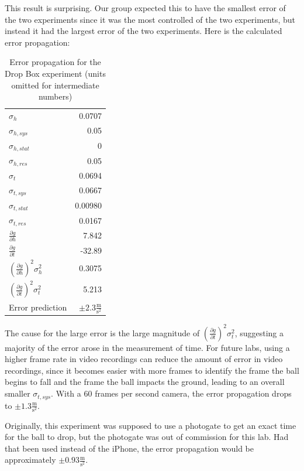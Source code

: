 \documentclass[12pt]{article}
\begin{document}
This result is surprising. Our group expected this to have the smallest error of the two experiments since it was the most controlled of the two experiments, but instead it had the largest error of the two experiments. Here is the calculated error propagation:

\begin{table}[htbp]
\caption{\label{table:dropbox-error}Error propagation for the Drop Box experiment (units omitted for intermediate numbers)}
\centering
\begin{tabular}{l|r}
\hline
\(\sigma_h\) & 0.0707\\
\(\sigma_{h,sys}\) & 0.05\\
\(\sigma_{h,stat}\) & 0\\
\(\sigma_{h,res}\) & 0.05\\
\hline
\(\sigma_t\) & 0.0694\\
\(\sigma_{t,sys}\) & 0.0667\\
\(\sigma_{t,stat}\) & 0.00980\\
\(\sigma_{t,res}\) & 0.0167\\
\hline
\(\frac{\partial g}{\partial h}\) & 7.842\\
\(\frac{\partial g}{\partial t}\) & -32.89\\
\hline
\(\left(\frac{\partial g}{\partial h}\right)^{2}\sigma_{h}^2\) & 0.3075\\
\(\left(\frac{\partial g}{\partial t}\right)^{2}\sigma_{t}^2\) & 5.213\\
\hline
Error prediction & \(\pm 2.3 \frac{\text{m}}{\text{s}^{2}}\)\\
\end{tabular}
\end{table}

The cause for the large error is the large magnitude of \(\left(\frac{\partial g}{\partial t}\right)^{2}\sigma_{t}^2\), suggesting a majority of the error arose in the measurement of time. For future labs, using a higher frame rate in video recordings can reduce the amount of error in video recordings, since it becomes easier with more frames to identify the frame the ball begins to fall and the frame the ball impacts the ground, leading to an overall smaller \(\sigma_{t,sys}\). With a 60 frames per second camera, the error propagation drops to \(\pm 1.3 \frac{\text{m}}{\text{s}^{2}}\).

Originally, this experiment was supposed to use a photogate to get an exact time for the ball to drop, but the photogate was out of commission for this lab. Had that been used instead of the iPhone, the error propagation would be approximately \(\pm 0.93 \frac{\text{m}}{\text{s}^{2}}\).
\end{document}
